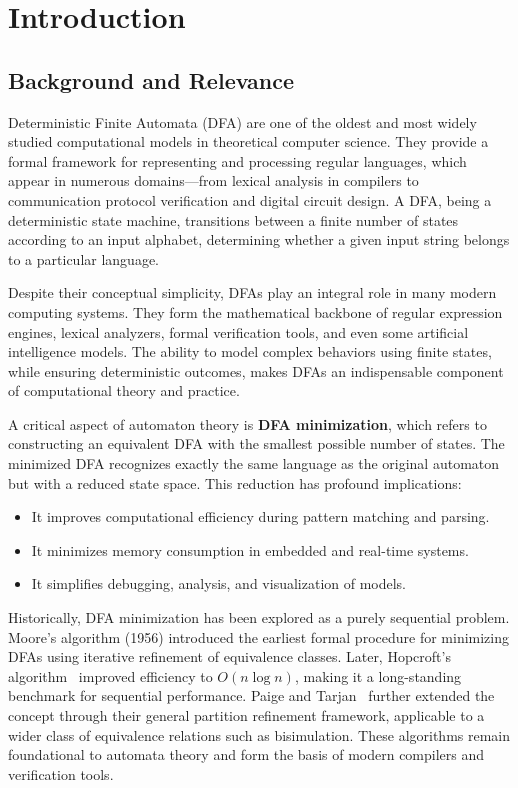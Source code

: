 \chapter{Introduction}
\label{chap:introduction}

\section{Background and Relevance}

Deterministic Finite Automata (DFA) are one of the oldest and most widely studied computational models in theoretical computer science. They provide a formal framework for representing and processing regular languages, which appear in numerous domains—from lexical analysis in compilers to communication protocol verification and digital circuit design. A DFA, being a deterministic state machine, transitions between a finite number of states according to an input alphabet, determining whether a given input string belongs to a particular language.

Despite their conceptual simplicity, DFAs play an integral role in many modern computing systems. They form the mathematical backbone of regular expression engines, lexical analyzers, formal verification tools, and even some artificial intelligence models. The ability to model complex behaviors using finite states, while ensuring deterministic outcomes, makes DFAs an indispensable component of computational theory and practice.

A critical aspect of automaton theory is \textbf{DFA minimization}, which refers to constructing an equivalent DFA with the smallest possible number of states. The minimized DFA recognizes exactly the same language as the original automaton but with a reduced state space. This reduction has profound implications:
\begin{itemize}
    \item It improves computational efficiency during pattern matching and parsing.
    \item It minimizes memory consumption in embedded and real-time systems.
    \item It simplifies debugging, analysis, and visualization of models.
\end{itemize}

Historically, DFA minimization has been explored as a purely sequential problem. Moore’s algorithm (1956) introduced the earliest formal procedure for minimizing DFAs using iterative refinement of equivalence classes. Later, Hopcroft’s algorithm~\cite{hopcroft1971} improved efficiency to $O(n \log n)$, making it a long-standing benchmark for sequential performance. Paige and Tarjan~\cite{paigetarjan1987} further extended the concept through their general partition refinement framework, applicable to a wider class of equivalence relations such as bisimulation. These algorithms remain foundational to automata theory and form the basis of modern compilers and verification tools.

